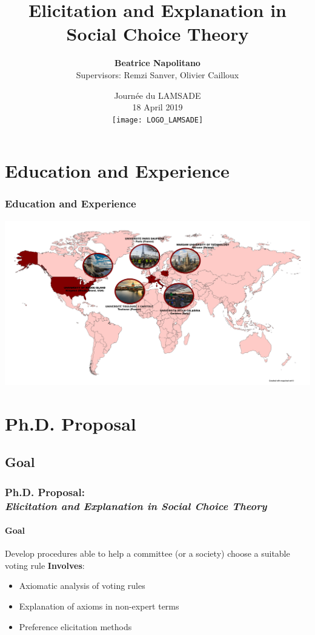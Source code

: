 \documentclass{beamer}
\title[Elicitation and Explanation in Social Choice]{Elicitation and Explanation in Social Choice Theory}
\author[Beatrice Napolitano]{\textbf{Beatrice Napolitano} \\
	Supervisors: Remzi Sanver, Olivier Cailloux}
\date[JdL 18 April 2019]{Journée du LAMSADE \\ 18 April 2019 \\ \texttt{[image: LOGO\_LAMSADE]} }
\begin{document}
\beamertemplatenavigationsymbolsempty

\begin{frame}[plain]
\maketitle
\end{frame}

\addtocounter{framenumber}{-1}


\section{Education and Experience}
\begin{frame}
	\frametitle{Education and Experience}
	\includegraphics[width=\textwidth]{map}
\end{frame}

\section{Ph.D. Proposal}
\subsection*{Goal}
\begin{frame}
\frametitle{Ph.D. Proposal: \\ \textit{Elicitation and Explanation in Social Choice Theory}}
\framesubtitle{Goal}
Develop procedures able to help a committee (or a society) choose a suitable voting rule
\newline \newline \textbf{Involves}:
\begin{itemize}
	\item Axiomatic analysis of voting rules
	\item Explanation of axioms in non-expert terms
	\item Preference elicitation methods
\end{itemize}
\end{frame}
\end{document}
